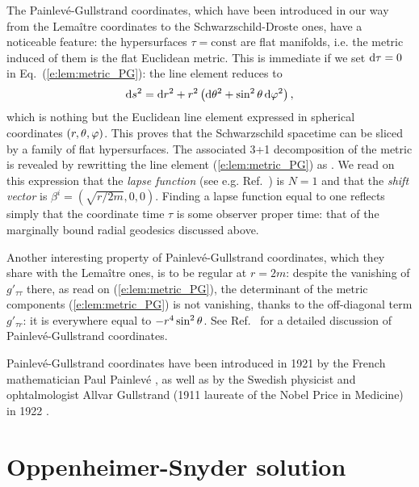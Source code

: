 \begin{remark}
The Painlevé-Gullstrand coordinates, which have been introduced
in our way from the Lemaître coordinates to the Schwarzschild-Droste ones,
have a noticeable feature: the hypersurfaces $\tau=\mathrm{const}$ are
flat manifolds, i.e. the metric induced of them is the flat Euclidean metric.
This is immediate if we set $\mathrm{d}\tau=0$ in Eq.~(\ref{e:lem:metric_PG}):
the line element reduces to
\[
    \mathrm{d} s^2 = \mathrm{d} r^2 + r^2 \left( \mathrm{d}\theta^2 + \sin^2\theta\, \mathrm{d}\varphi^2 \right) ,
\]
which is nothing but the Euclidean line element expressed in spherical coordinates
$(r,\theta,\varphi)$. This proves that the Schwarzschild spacetime can be sliced
by a family of flat hypersurfaces. The associated 3+1 decomposition
of the metric is revealed by rewritting the line element (\ref{e:lem:metric_PG})
as
\be
        .
\ee
We read on this expression that the \emph{lapse function}
(see e.g. Ref.~\cite{Gourg12}) is $N=1$ and that the \emph{shift vector}
is $\beta^i = (\sqrt{r/2m},0,0)$. Finding a lapse function equal to one reflects simply
that the coordinate time $\tau$ is some observer proper time: that of the
marginally bound radial geodesics discussed above.

Another interesting property of Painlevé-Gullstrand coordinates, which they
share with the Lemaître ones, is to be regular at $r=2m$: despite the vanishing of
$g'_{\tau\tau}$ there, as read on (\ref{e:lem:metric_PG}), the determinant
of the metric components (\ref{e:lem:metric_PG}) is not vanishing, thanks
to the off-diagonal term $g'_{\tau r}$: it is everywhere equal
to $-r^4\sin^2\theta$. See Ref.~\cite{MarteP01} for a detailed
discussion of Painlevé-Gullstrand coordinates.
\end{remark}


\begin{hist}
Painlevé-Gullstrand coordinates have been introduced in 1921 by the
French mathematician
Paul Painlevé \cite{Painl1921}, as well as by the Swedish physicist and ophtalmologist
Allvar Gullstrand (1911 laureate of the Nobel Price in Medicine) in 1922 \cite{Gulls1922}.
\end{hist}

\section{Oppenheimer-Snyder solution}





















